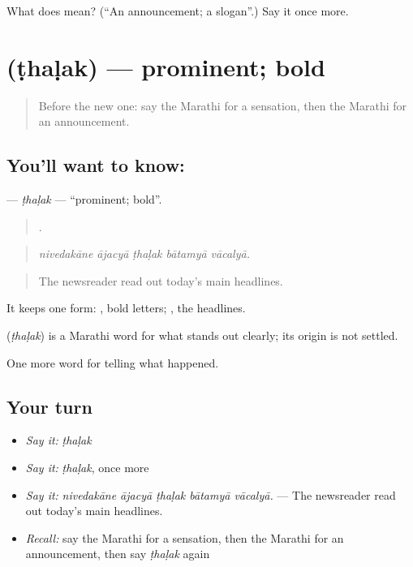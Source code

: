 \begin{tcolorbox}[breakable,colback=teal!4,colframe=teal!35!black,title={Before you move on}]
What does  mean? (\textquotedblleft{}An announcement; a slogan\textquotedblright{}.) Say it once more.
\end{tcolorbox}
\section[\texorpdfstring{\mr{ठळक} (ṭhaḷak)}{ठळक (ṭhaḷak)}]{ (ṭhaḷak) — prominent; bold}

\label{lesson:MR-C313-thalak}



\begin{quote}
Before the new one: say the Marathi for a sensation, then the Marathi for an announcement.
\end{quote}

\subsection*{You'll want to know: }
\textbf{} — \emph{ṭhaḷak} — \textquotedblleft{}prominent; bold\textquotedblright{}.

\begin{quote}
    .
\end{quote}

\begin{quote}
\emph{nivedakāne ājacyā ṭhaḷak bātamyā vācalyā.}
\end{quote}

\begin{quote}
The newsreader read out today's main headlines.
\end{quote}

It keeps one form:  , bold letters;  , the headlines.

\begin{cousinweb}
\textbf{} (\emph{ṭhaḷak}) is a Marathi word for what stands out clearly; its origin is not settled.
\end{cousinweb}

\begin{grammarlens}[title={What you've built}]
One more word for telling what happened.
\end{grammarlens}

\subsection*{Your turn}
\begin{itemize}
\raggedright
  \item \emph{Say it:} \emph{ṭhaḷak}
  \item \emph{Say it:} \emph{ṭhaḷak}, once more
  \item \emph{Say it:} \emph{nivedakāne ājacyā ṭhaḷak bātamyā vācalyā.} — The newsreader read out today's main headlines.
  \item \emph{Recall:} say the Marathi for a sensation, then the Marathi for an announcement, then say \emph{ṭhaḷak} again
\end{itemize}

